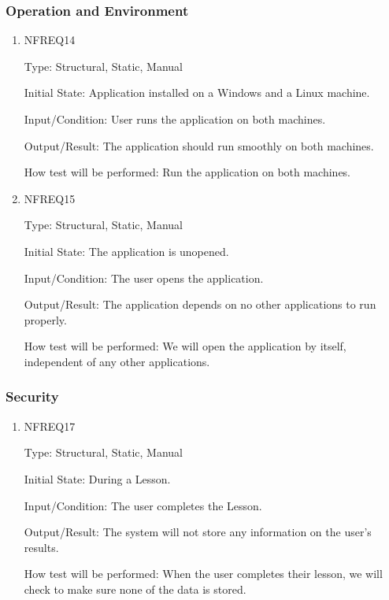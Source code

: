 \documentclass[12pt, titlepage]{article}
\begin{document}
\subsubsection{Operation and Environment}
\begin{enumerate}

\item{NFREQ14\\}

Type: Structural, Static, Manual
					
Initial State: Application installed on a Windows and a Linux machine.
					
Input/Condition: User runs the application on both machines.
					
Output/Result: The application should run smoothly on both machines.
					
How test will be performed: Run the application on both machines.

\item{NFREQ15\\}

Type: Structural, Static, Manual
					
Initial State: The application is unopened.
					
Input/Condition: The user opens the application.
					
Output/Result: The application depends on no other applications to run properly.
					
How test will be performed: We will open the application by itself, independent of any other applications.

\end{enumerate}

\subsubsection{Security}
\begin{enumerate}

\item{NFREQ17\\}

Type: Structural, Static, Manual
					
Initial State: During a Lesson.
					
Input/Condition: The user completes the Lesson.
					
Output/Result: The system will not store any information on the user's results. 
					
How test will be performed: When the user completes their lesson, we will check to make sure none of the data is stored.

\end{enumerate}
\end{document}
